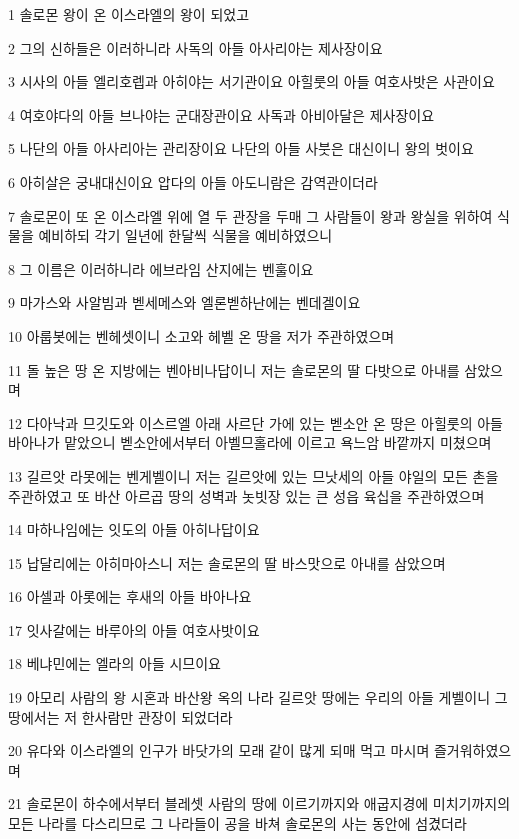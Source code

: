 \par 1 솔로몬 왕이 온 이스라엘의 왕이 되었고
\par 2 그의 신하들은 이러하니라 사독의 아들 아사리아는 제사장이요
\par 3 시사의 아들 엘리호렙과 아히야는 서기관이요 아힐룻의 아들 여호사밧은 사관이요
\par 4 여호야다의 아들 브나야는 군대장관이요 사독과 아비아달은 제사장이요
\par 5 나단의 아들 아사리아는 관리장이요 나단의 아들 사붓은 대신이니 왕의 벗이요
\par 6 아히살은 궁내대신이요 압다의 아들 아도니람은 감역관이더라
\par 7 솔로몬이 또 온 이스라엘 위에 열 두 관장을 두매 그 사람들이 왕과 왕실을 위하여 식물을 예비하되 각기 일년에 한달씩 식물을 예비하였으니
\par 8 그 이름은 이러하니라 에브라임 산지에는 벤훌이요
\par 9 마가스와 사알빔과 벧세메스와 엘론벧하난에는 벤데겔이요
\par 10 아룹봇에는 벤헤셋이니 소고와 헤벨 온 땅을 저가 주관하였으며
\par 11 돌 높은 땅 온 지방에는 벤아비나답이니 저는 솔로몬의 딸 다밧으로 아내를 삼았으며
\par 12 다아낙과 므깃도와 이스르엘 아래 사르단 가에 있는 벧소안 온 땅은 아힐룻의 아들 바아나가 맡았으니 벧소안에서부터 아벨므홀라에 이르고 욕느암 바깥까지 미쳤으며
\par 13 길르앗 라못에는 벤게벨이니 저는 길르앗에 있는 므낫세의 아들 야일의 모든 촌을 주관하였고 또 바산 아르곱 땅의 성벽과 놋빗장 있는 큰 성읍 육십을 주관하였으며
\par 14 마하나임에는 잇도의 아들 아히나답이요
\par 15 납달리에는 아히마아스니 저는 솔로몬의 딸 바스맛으로 아내를 삼았으며
\par 16 아셀과 아롯에는 후새의 아들 바아나요
\par 17 잇사갈에는 바루아의 아들 여호사밧이요
\par 18 베냐민에는 엘라의 아들 시므이요
\par 19 아모리 사람의 왕 시혼과 바산왕 옥의 나라 길르앗 땅에는 우리의 아들 게벨이니 그 땅에서는 저 한사람만 관장이 되었더라
\par 20 유다와 이스라엘의 인구가 바닷가의 모래 같이 많게 되매 먹고 마시며 즐거워하였으며
\par 21 솔로몬이 하수에서부터 블레셋 사람의 땅에 이르기까지와 애굽지경에 미치기까지의 모든 나라를 다스리므로 그 나라들이 공을 바쳐 솔로몬의 사는 동안에 섬겼더라
